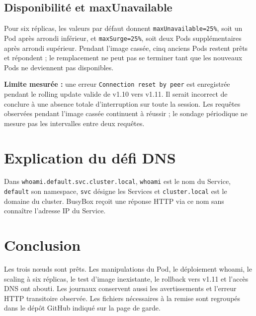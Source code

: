 \documentclass[11pt,a4paper]{article}
\begin{document}
\subsection{Disponibilité et maxUnavailable}
Pour six réplicas, les valeurs par défaut donnent \texttt{maxUnavailable=25\%}, soit un Pod après arrondi inférieur, et \texttt{maxSurge=25\%}, soit deux Pods supplémentaires après arrondi supérieur. Pendant l'image cassée, cinq anciens Pods restent prêts et répondent ; le remplacement ne peut pas se terminer tant que les nouveaux Pods ne deviennent pas disponibles.

\textbf{Limite mesurée :} une erreur \texttt{Connection reset by peer} est enregistrée pendant le rolling update valide de v1.10 vers v1.11. Il serait incorrect de conclure à une absence totale d'interruption sur toute la session. Les requêtes observées pendant l'image cassée continuent à réussir ; le sondage périodique ne mesure pas les intervalles entre deux requêtes.
\section{Explication du défi DNS}
Dans \texttt{whoami.default.svc.cluster.local}, \texttt{whoami} est le nom du Service, \texttt{default} son namespace, \texttt{svc} désigne les Services et \texttt{cluster.local} est le domaine du cluster. BusyBox reçoit une réponse HTTP via ce nom sans connaître l'adresse IP du Service.
\section*{Conclusion}
Les trois nœuds sont prêts. Les manipulations du Pod, le déploiement whoami, le scaling à six réplicas, le test d'image inexistante, le rollback vers v1.11 et l'accès DNS ont abouti. Les journaux conservent aussi les avertissements et l'erreur HTTP transitoire observée. Les fichiers nécessaires à la remise sont regroupés dans le dépôt GitHub indiqué sur la page de garde.
\end{document}
